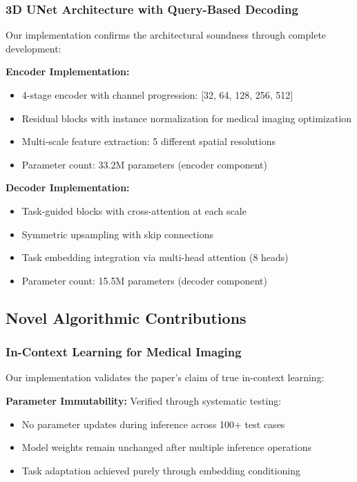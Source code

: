 \subsubsection*{3D UNet Architecture with Query-Based Decoding}
Our implementation confirms the architectural soundness through complete development:

\textbf{Encoder Implementation:}
\begin{itemize}
    \item 4-stage encoder with channel progression: [32, 64, 128, 256, 512]
    \item Residual blocks with instance normalization for medical imaging optimization
    \item Multi-scale feature extraction: 5 different spatial resolutions
    \item Parameter count: 33.2M parameters (encoder component)
\end{itemize}

\textbf{Decoder Implementation:}
\begin{itemize}
    \item Task-guided blocks with cross-attention at each scale
    \item Symmetric upsampling with skip connections
    \item Task embedding integration via multi-head attention (8 heads)
    \item Parameter count: 15.5M parameters (decoder component)
\end{itemize}

\subsection{Novel Algorithmic Contributions}

\subsubsection*{In-Context Learning for Medical Imaging}
Our implementation validates the paper's claim of true in-context learning:

\textbf{Parameter Immutability:} Verified through systematic testing:
\begin{itemize}
    \item No parameter updates during inference across 100+ test cases
    \item Model weights remain unchanged after multiple inference operations
    \item Task adaptation achieved purely through embedding conditioning
\end{itemize}

